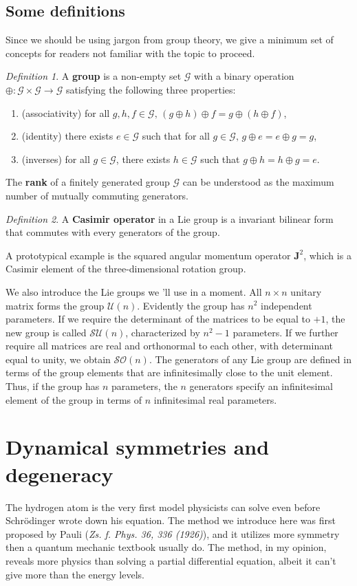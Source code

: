 \documentclass[a4paper,11pt]{article}
\theoremstyle{remark}
\theoremstyle{defn}
\newtheorem{defn}{Definition}[section]
\begin{document}
\subsection{Some definitions}
Since we should be using jargon from group theory, we give a minimum set of concepts for readers not familiar with the topic to proceed.
\begin{defn}
A \textbf{group} is a non-empty set $\mathcal{G}$ with a binary operation $\oplus: \mathcal{G} \times \mathcal{G} \rightarrow \mathcal{G}$
satisfying the following three properties:
\begin{enumerate}
\item (associativity) for all $g,h,f \in \mathcal{G},\, (g \oplus h) \oplus f = g \oplus (h \oplus f)$,
\item (identity) there exists $e \in \mathcal{G}$ such that for all $g \in \mathcal{G}, \,g \oplus e = e \oplus g = g$,
\item (inverses) for all $g \in \mathcal{G}$, there exists $h \in \mathcal{G}$ such that $g \oplus h = h \oplus g = e$.
\end{enumerate}
\end{defn}
The \textbf{rank} of a finitely generated group $\mathcal{G}$ can be understood as the maximum number of mutually commuting generators.
\begin{defn}
A \textbf{Casimir operator} in a Lie group is a invariant bilinear form that commutes with every generators of the group.
\end{defn}
A prototypical example is the squared angular momentum operator $\textbf{J}^2$, which is a Casimir element of the three-dimensional rotation group.\par
We also introduce the Lie groups we 'll use in a moment. All $n\times n$ unitary matrix forms the group $\mathcal{U}(n)$.
Evidently the group has $n^2$ independent parameters. 
If we require the determinant of the matrices to be equal to $+ 1$, the
new group is called $\mathcal{SU}(n)$, characterized by $n^2-1$ parameters. 
If we further require all matrices are real and orthonormal to each other, with determinant equal to unity, we obtain $\mathcal{SO}(n)$. 
The generators of any Lie group are defined in terms of the group
elements that are infinitesimally close to the unit element. Thus, if the group has $n$ parameters, the $n$ generators 
specify an infinitesimal element of the group in terms of $n$ infinitesimal real parameters.

\section{Dynamical symmetries and degeneracy}
The hydrogen atom is the very first model physicists can solve even before Schr\"odinger wrote down his equation. 
The method we introduce here was first proposed by Pauli (\textit{Zs. f. Phys. 36, 336 (1926)}), 
and it utilizes more symmetry then a quantum mechanic 
textbook usually do. The method, in my opinion, reveals more physics than solving a partial differential equation,
albeit it can't give more than the energy levels.\par 
\end{document}
